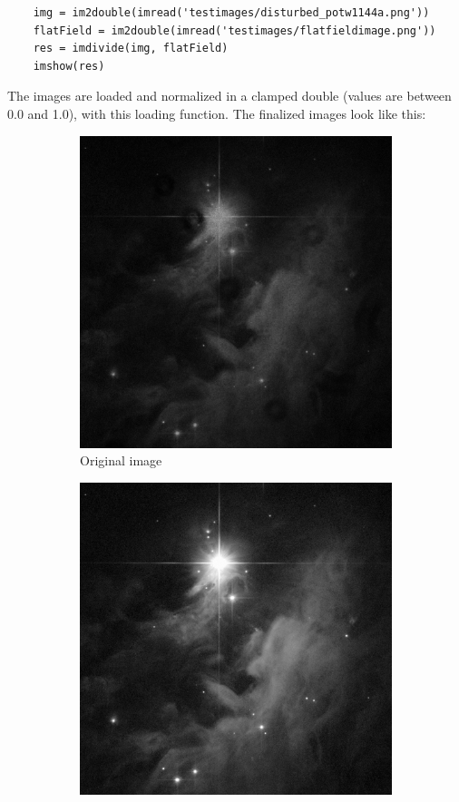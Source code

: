 \documentclass{article}
\begin{document}
\begin{lstlisting}	
	img = im2double(imread('testimages/disturbed_potw1144a.png'))
	flatField = im2double(imread('testimages/flatfieldimage.png'))
	res = imdivide(img, flatField)
	imshow(res)
\end{lstlisting}
The images are loaded and normalized in a clamped double (values are between 0.0 and 1.0), with this loading function.
The finalized images look like this:
\\
\begin{figure}[h]
	\centering
	\begin{subfigure}[b]{0.45\textwidth}
		\includegraphics[width = \textwidth]{astro1.png}
		\caption{Original image}
		\label{fig:astro1.png}
	\end{subfigure}
	\begin{subfigure}[b]{ 0.45\textwidth}
		\includegraphics[width=\textwidth]{astro2.png}

\end{subfigure}
\end{figure}
\end{document}
